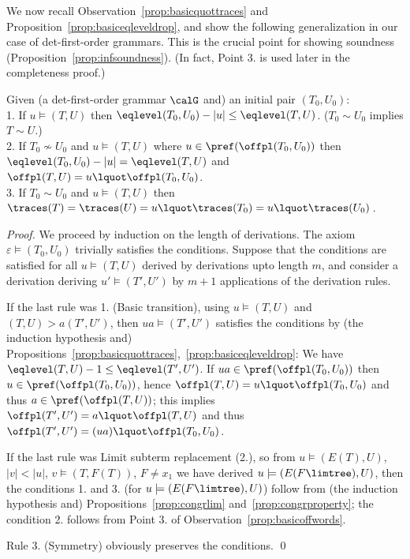 \documentclass[12pt]{article}
\begin{document}
We now recall Observation~\ref{prop:basicquottraces}
and Proposition~\ref{prop:basiceqleveldrop}, 
and show the following generalization  
in our case of det-first-order grammars.
This is the crucial point for showing
soundness (Proposition~\ref{prop:infsoundness}).
(In fact, Point 3. is used later 
 in the 
 completeness proof.)

\begin{prop}\label{prop:indsound}
Given (a det-first-order grammar $\calG$ and) an initial pair $(T_0,U_0)$:
\\
1. If $u\models (T,U)$  then 
$\eqlevel(T_0,U_0)-|u|\leq \eqlevel(T,U)$.
($T_0\sim U_0$ implies $T\sim U$.)
\\
2. If  $T_0\not\sim U_0$ and $u\models (T,U)$ where 
$u\in\pref(\offpl(T_0,U_0))$ 
then
\\
\hspace*{2em}$\eqlevel(T_0,U_0)-|u|=\eqlevel(T,U)$
and
$\offpl(T,U)=u\lquot \offpl(T_0,U_0)$.
\\
3.
If $T_0\sim U_0$ and $u\models (T,U)$ then
$\traces(T)=\traces(U)=u\lquot \traces(T_0) =u\lquot \traces(U_0)$\,.
\end{prop}
\begin{proof}
We proceed by induction on the length of derivations.
The axiom $\varepsilon\models (T_0,U_0)$ trivially satisfies the
conditions. Suppose that the conditions are satisfied for 
all $u\models (T,U)$ derived by derivations upto length $m$, and
consider a derivation deriving  $u'\models (T',U')$ by $m+1$ applications
of the derivation rules. 

If the last rule was 1. (Basic transition),
using $u\models (T,U)$ and $(T,U)\gt{a}(T',U')$, 
then $ua\models (T',U')$ satisfies the conditions by (the induction
hypothesis and) 
Propositions~\ref{prop:basicquottraces},~\ref{prop:basiceqleveldrop}:
We have $\eqlevel(T,U)-1\leq \eqlevel(T',U')$. If  
$ua\in \pref(\offpl(T_0,U_0))$ then $u\in\pref(\offpl(T_0,U_0))$,
hence $\offpl(T,U)=u\lquot \offpl(T_0,U_0)$ and thus
$a\in\pref(\offpl(T,U))$;
this implies
$\offpl(T',U')=a\lquot \offpl(T,U)$
and thus $\offpl(T',U')=(ua)\lquot \offpl(T_0,U_0)$.

If the last rule was Limit subterm replacement (2.),
so from $u\models (E(T),U)$, $|v|<|u|$,
  $v\models (T,F(T))$, $F\neq x_1$ we have derived
$u\models (E(F\limtree),U)$,
then
the conditions 1. and 3. (for  $u\models (E(F\limtree),U)$) 
follow from (the induction hypothesis and)
Propositions~\ref{prop:congrlim} 
and~\ref{prop:congrproperty};  the condition 2. follows
from Point 3. of Observation~\ref{prop:basicoffwords}.

Rule 3. (Symmetry) obviously preserves the conditions. 
\qed
\end{proof}
\end{document}
